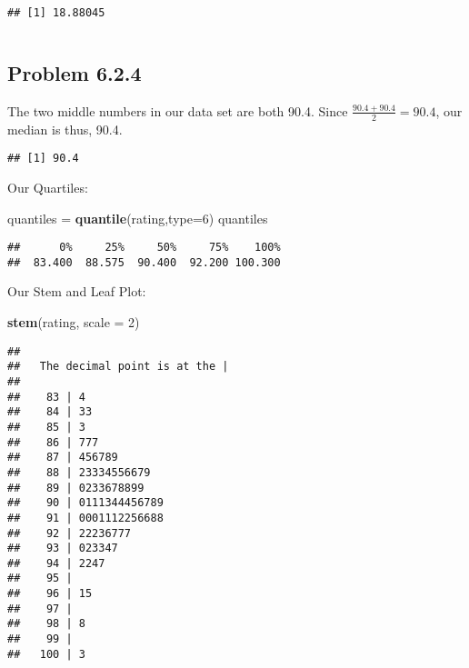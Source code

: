 \documentclass[
]{article}
\newenvironment{Shaded}{\begin{snugshade}}{\end{snugshade}}
\newcommand{\AttributeTok}[1]{\textcolor[rgb]{0.13,0.29,0.53}{#1}}
\newcommand{\ConstantTok}[1]{\textcolor[rgb]{0.56,0.35,0.01}{#1}}
\newcommand{\DecValTok}[1]{\textcolor[rgb]{0.00,0.00,0.81}{#1}}
\newcommand{\FunctionTok}[1]{\textcolor[rgb]{0.13,0.29,0.53}{\textbf{#1}}}
\newcommand{\NormalTok}[1]{#1}
\newcommand{\OtherTok}[1]{\textcolor[rgb]{0.56,0.35,0.01}{#1}}
\newcommand{\SpecialCharTok}[1]{\textcolor[rgb]{0.81,0.36,0.00}{\textbf{#1}}}
\newcommand{\StringTok}[1]{\textcolor[rgb]{0.31,0.60,0.02}{#1}}
\begin{document}
\begin{verbatim}
## [1] 18.88045
\end{verbatim}

\(~\)

\pagebreak

\subsection{Problem 6.2.4}\label{problem-6.2.4}

The two middle numbers in our data set are both 90.4. Since
\(\frac{90.4 + 90.4}{2} = 90.4\), our median is thus, 90.4.

\begin{Shaded}
\end{Shaded}

\begin{verbatim}
## [1] 90.4
\end{verbatim}

Our Quartiles:

\begin{Shaded}
\begin{Highlighting}[]
\NormalTok{quantiles }\OtherTok{=} \FunctionTok{quantile}\NormalTok{(rating,}\AttributeTok{type=}\DecValTok{6}\NormalTok{)}
\NormalTok{quantiles}
\end{Highlighting}
\end{Shaded}

\begin{verbatim}
##      0%     25%     50%     75%    100% 
##  83.400  88.575  90.400  92.200 100.300
\end{verbatim}

Our Stem and Leaf Plot:

\begin{Shaded}
\begin{Highlighting}[]
\FunctionTok{stem}\NormalTok{(rating, }\AttributeTok{scale =} \DecValTok{2}\NormalTok{)}
\end{Highlighting}
\end{Shaded}

\begin{verbatim}
## 
##   The decimal point is at the |
## 
##    83 | 4
##    84 | 33
##    85 | 3
##    86 | 777
##    87 | 456789
##    88 | 23334556679
##    89 | 0233678899
##    90 | 0111344456789
##    91 | 0001112256688
##    92 | 22236777
##    93 | 023347
##    94 | 2247
##    95 | 
##    96 | 15
##    97 | 
##    98 | 8
##    99 | 
##   100 | 3
\end{verbatim}
\end{document}
